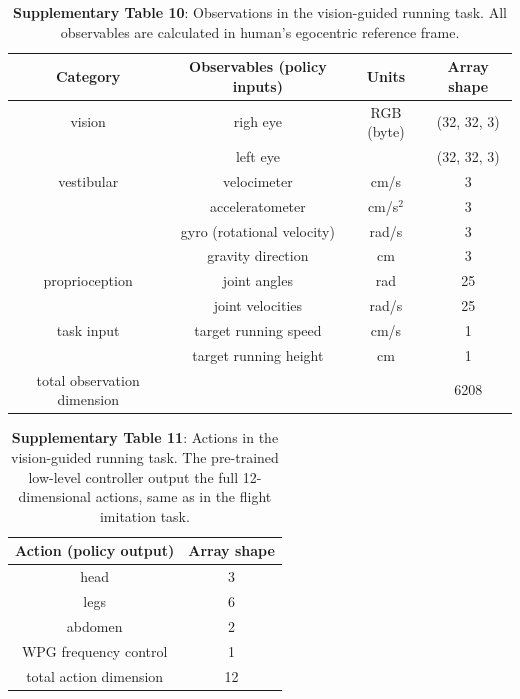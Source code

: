 \documentclass[sn-mathphys-num]{sn-jnl}%
\theoremstyle{thmstyleone}	%
\theoremstyle{thmstyletwo}	%
\theoremstyle{thmstylethree}	%
\begin{document}
\begin{appendices}
\begin{table}[htbp]
	\centering
	\small
	\caption{\textbf{Supplementary Table 10}: 
		Observations in the vision-guided running task. 
		All observables are calculated in human's egocentric reference frame.
	}
	\begin{tabular}{cccc}
		\toprule
		\textbf{Category}         &        \textbf{Observables (policy inputs)}  & \textbf{Units}  & \textbf{Array shape}  \\
		\midrule
		vision     &   righ eye     &  RGB (byte)  & (32, 32, 3)  \\
		     &   left eye     &    & (32, 32, 3)  \\
		\midrule
		vestibular     &   velocimeter     &  cm/s  & 3  \\
		     &   acceleratometer     &  cm/s$ ^2 $  & 3  \\
		     &   gyro (rotational velocity)     &  rad/s  & 3  \\
		     &   gravity direction     &  cm  & 3  \\
		\midrule
		proprioception     &   joint angles     &  rad  & 25  \\
		     &   joint velocities     &  rad/s  & 25  \\
		\midrule
		task input     &   target running speed     &  cm/s  & 1  \\
		     &   target running height     &  cm  & 1  \\
		\midrule
		total observation dimension     &        &    & 6208  \\
		\bottomrule
	\end{tabular}%
	\label{tab:s_10}%
\end{table}%



\begin{table}[htbp]
	\centering
	\small
	\caption{\textbf{Supplementary Table 11}: 
		Actions in the vision-guided running task.
		The pre-trained low-level controller output the full 12-dimensional actions, same as in the flight imitation task.
	}
	\begin{tabular}{cc}
		\toprule
		Action (policy output)         &        Array shape    \\
		\midrule
		head     &  3        \\
		legs     &  6        \\
		abdomen     &  2        \\
		WPG frequency control     &  1        \\
		\midrule
		total action dimension     &  12        \\
		\bottomrule
	\end{tabular}%
	\label{tab:s_11}%
\end{table}%




\end{appendices}
\end{document}
